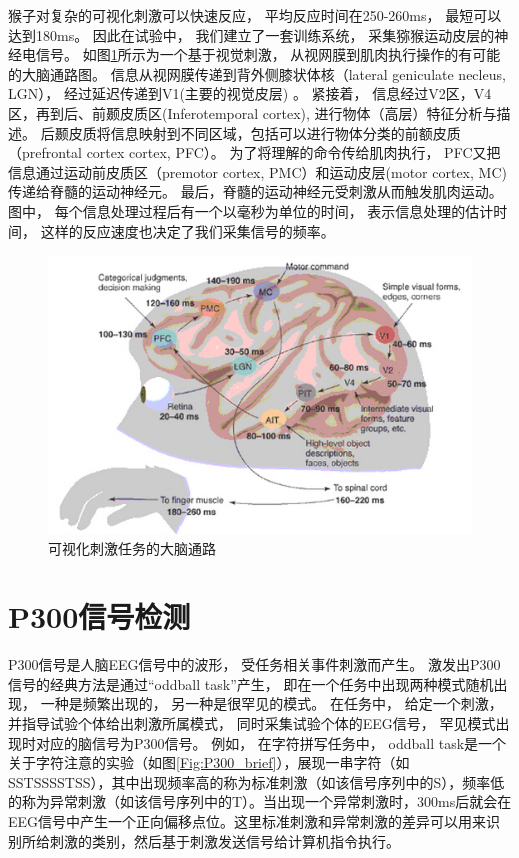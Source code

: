 猴子对复杂的可视化刺激可以快速反应， 平均反应时间在250-260ms， 最短可以达到180ms。 因此在试验中， 我们建立了一套训练系统， 采集猕猴运动皮层的神经电信号。 如图\ref{Fig:brain_stimulate_flow}所示为一个基于视觉刺激， 从视网膜到肌肉执行操作的有可能的大脑通路图\cite{thorpe2001seeking}。 信息从视网膜传递到背外侧膝状体核（lateral geniculate necleus, LGN）， 经过延迟传递到V1(主要的视觉皮层) 。 紧接着， 信息经过V2区，V4区，再到后、前颞皮质区(Inferotemporal cortex), 进行物体（高层）特征分析与描述。 后颞皮质将信息映射到不同区域，包括可以进行物体分类的前额皮质（prefrontal cortex cortex, PFC）。 为了将理解的命令传给肌肉执行， PFC又把信息通过运动前皮质区（premotor cortex, PMC）和运动皮层(motor cortex, MC)传递给脊髓的运动神经元。 最后，脊髓的运动神经元受刺激从而触发肌肉运动。 图中， 每个信息处理过程后有一个以毫秒为单位的时间， 表示信息处理的估计时间， 这样的反应速度也决定了我们采集信号的频率。

\begin{figure}[htb]
\centering
\includegraphics{Pictures/Introduction/brain_flow.jpg}
\caption{可视化刺激任务的大脑通路}
\label{Fig:brain_stimulate_flow}
\end{figure}



\section{P300信号检测}\label{sec:introduction_p300}

P300信号是人脑EEG信号中的波形， 受任务相关事件刺激而产生。 激发出P300信号的经典方法是通过“oddball task”产生， 即在一个任务中出现两种模式随机出现， 一种是频繁出现的， 另一种是很罕见的模式。 在任务中， 给定一个刺激，并指导试验个体给出刺激所属模式， 同时采集试验个体的EEG信号， 罕见模式出现时对应的脑信号为P300信号。 例如， 在字符拼写任务中， oddball task是一个关于字符注意的实验（如图\ref{Fig:P300_brief}\cite{polich2007updating}），展现一串字符（如SSTSSSSTSS），其中出现频率高的称为标准刺激（如该信号序列中的S），频率低的称为异常刺激（如该信号序列中的T）。当出现一个异常刺激时，300ms后就会在EEG信号中产生一个正向偏移点位。这里标准刺激和异常刺激的差异可以用来识别所给刺激的类别，然后基于刺激发送信号给计算机指令执行。
 
